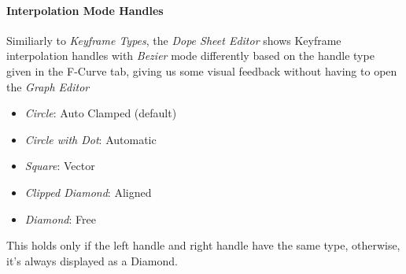 \documentclass{article}
\begin{document}
\paragraph{Interpolation Mode Handles}
Similiarly to \textit{Keyframe Types}, the \textit{Dope Sheet Editor} shows Keyframe interpolation handles with \textit{Bezier} mode differently based on the handle type given in the F-Curve tab, 
giving us some visual feedback without having to open the \textit{Graph Editor}
\begin{itemize}[noitemsep, topsep=0pt]
    \item \textit{Circle}: Auto Clamped (default)
    \item \textit{Circle with Dot}: Automatic
    \item \textit{Square}: Vector
    \item \textit{Clipped Diamond}: Aligned
    \item \textit{Diamond}: Free
\end{itemize}
This holds only if the left handle and right handle have the same type, otherwise, it's always displayed as a Diamond.
\end{document}
